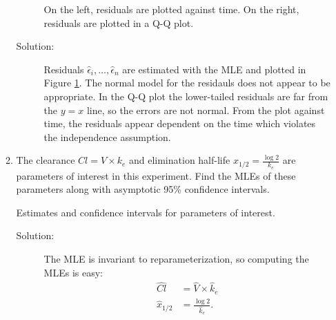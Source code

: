 \documentclass[letterpaper,11pt]{article}
\begin{document}
\begin{enumerate}
\begin{enumerate}
\begin{figure}
      \caption{On the left, residuals are plotted against time. On the right,
        residuals are plotted in a Q-Q plot.}
      \label{fig:p3_residuals}
    \end{figure}
    \begin{description}
    \item[Solution:] Residuals $\hat{\epsilon}_i,\ldots,\hat{\epsilon}_n$ are
      estimated with the MLE and plotted in Figure \ref{fig:p3_residuals}. The
      normal model for the residauls does not appear to be appropriate. In the
      Q-Q plot the lower-tailed residuals are far from the $y=x$ line, so the
      errors are not normal. From the plot against time, the residuals appear
      dependent on the time which violates the independence assumption.
    \end{description}
  \item The clearance $Cl = V \times k_e$ and elimination half-life
    $x_{1/2} = \frac{\log 2}{k_e}$ are parameters of interest in this experiment. Find
    the MLEs of these parameters along with asymptotic 95\% confidence intervals.

    \begin{table}
      \scriptsize
      \centering
      
      \caption{Estimates and confidence intervals for parameters of interest.}
      \label{tab:p3_parameters_of_interest}
    \end{table}
    \begin{description}
    \item[Solution:] The MLE is invariant to reparameterization, so computing
      the MLEs is easy:
      \begin{align}
        \hat{Cl}
        &= \hat{V} \times \hat{k}_e \nonumber\\
        \hat{x}_{1/2}
        &= \frac{\log 2}{\hat{k}_e}.
          \label{eqn:p3_mle_reparameterization}
      \end{align}


\end{description}
\end{enumerate}
\end{enumerate}
\end{document}
